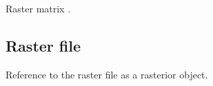 \documentclass[letterpaper,10pt,english]{sphinxmanual}
\begin{document}
\begin{fulllineitems}
\label{\detokenize{usage:tocdata.TOCData.raster}}
\pysigstartsignatures
{}
\pysigstopsignatures
\sphinxAtStartPar
Raster matrix .

\end{fulllineitems}



\subsection{Raster file}
\label{\detokenize{usage:raster-file}}

\begin{fulllineitems}
\label{\detokenize{usage:tocdata.TOCData.raster_file}}
\pysigstartsignatures
{}
\pysigstopsignatures
\sphinxAtStartPar
Reference to the raster file as a rasterior object.

\end{fulllineitems}




\renewcommand{\indexname}{Index}
\printindex
\end{document}

